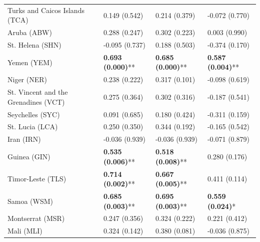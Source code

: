 \begin{longtable}{p{5cm}p{3cm}p{3cm}p{5cm}}
Turks and Caicos Islands (TCA) & \textcolor{atlOrange600}{0.149 (0.542)} & \textcolor{atlOrange600}{0.214 (0.379)} & \textcolor{atlOrange600}{-0.072 (0.770)} \\
Aruba (ABW) & \textcolor{atlOrange600}{0.288 (0.247)} & \textcolor{atlOrange600}{0.302 (0.223)} & \textcolor{atlOrange600}{0.003 (0.990)} \\
St. Helena (SHN) & \textcolor{atlOrange600}{-0.095 (0.737)} & \textcolor{atlOrange600}{0.188 (0.503)} & \textcolor{atlOrange600}{-0.374 (0.170)} \\
Yemen (YEM) & \textcolor{atlLime600}{\textbf{0.693 (0.000)}**} & \textcolor{atlLime600}{\textbf{0.685 (0.000)}**} & \textcolor{atlLime600}{\textbf{0.587 (0.004)}**} \\
Niger (NER) & \textcolor{atlOrange600}{0.238 (0.222)} & \textcolor{atlOrange600}{0.317 (0.101)} & \textcolor{atlOrange600}{-0.098 (0.619)} \\
St. Vincent and the Grenadines (VCT) & \textcolor{atlOrange600}{0.275 (0.364)} & \textcolor{atlOrange600}{0.302 (0.316)} & \textcolor{atlOrange600}{-0.187 (0.541)} \\
Seychelles (SYC) & \textcolor{atlOrange600}{0.091 (0.685)} & \textcolor{atlOrange600}{0.180 (0.424)} & \textcolor{atlOrange600}{-0.311 (0.159)} \\
St. Lucia (LCA) & \textcolor{atlOrange600}{0.250 (0.350)} & \textcolor{atlOrange600}{0.344 (0.192)} & \textcolor{atlOrange600}{-0.165 (0.542)} \\
Iran (IRN) & \textcolor{atlOrange600}{-0.036 (0.939)} & \textcolor{atlOrange600}{-0.036 (0.939)} & \textcolor{atlOrange600}{-0.071 (0.879)} \\
Guinea (GIN) & \textcolor{atlLime600}{\textbf{0.535 (0.006)}**} & \textcolor{atlLime600}{\textbf{0.518 (0.008)}**} & \textcolor{atlOrange600}{0.280 (0.176)} \\
Timor-Leste (TLS) & \textcolor{atlLime600}{\textbf{0.714 (0.002)}**} & \textcolor{atlLime600}{\textbf{0.667 (0.005)}**} & \textcolor{atlOrange600}{0.411 (0.114)} \\
Samoa (WSM) & \textcolor{atlLime600}{\textbf{0.685 (0.003)}**} & \textcolor{atlLime600}{\textbf{0.695 (0.003)}**} & \textcolor{atlLime600}{\textbf{0.559 (0.024)}*} \\
Montserrat (MSR) & \textcolor{atlOrange600}{0.247 (0.356)} & \textcolor{atlOrange600}{0.324 (0.222)} & \textcolor{atlOrange600}{0.221 (0.412)} \\
Mali (MLI) & \textcolor{atlOrange600}{0.324 (0.142)} & \textcolor{atlOrange600}{0.380 (0.081)} & \textcolor{atlOrange600}{-0.036 (0.875)} \\

\end{longtable}
